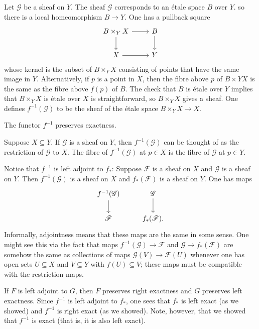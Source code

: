 \documentclass [11 pt, oneside, margin = 1 in] {article}
\begin{document}
Let $\mathscr{G}$ be a sheaf on $Y$. The sheaf $\mathscr{G}$ corresponds to an \'etale space $B$ over $Y$. so there is a local homeomorphism $B\longrightarrow Y$. One has a pullback square
\[
\begin{tikzcd}
	B\times_Y X \ar[r] \ar[d] & B\ar[d]\\
	X \ar[r] & Y
\end{tikzcd}
\]
whose kernel is the subset of $B\times_Y X$ consisting of points that have the same image in $Y$. Alternatively, if $p$ is a point in $X$, then the fibre above $p$ of $B\times Y X$ is the same as the fibre above $f(p)$ of $B$. The check that $B$ is \'etale over $Y$ implies that $B\times_Y X$ is \'etale over $X$ is straightforward, so $B\times_Y X$ gives a sheaf. One defines $f^{-1}(\mathscr{G})$ to be the sheaf of the \'etale space $B\times_Y X\longrightarrow X$.

\begin{remark}
	The functor $f^{-1}$ preserves exactness.
\end{remark}

\begin{example}[ ]\label{}\text{}
Suppose $X\subseteq Y$. If $\mathscr{G}$ is a sheaf on $Y$, then $f^{-1}(\mathscr{G})$ can be thought of as the restriction of $\mathscr{G}$ to $X$. The fibre of $f^{-1}(\mathscr{G})$ at $p\in X$ is the fibre of $\mathscr{G}$ at $p\in Y$.
\end{example}

Notice that $f^{-1}$ is left adjoint to $f_*$: Suppose $\mathscr{F}$ is a sheaf on $X$ and $\mathscr{G}$ is a sheaf on $Y$. Then $f^{-1}(\mathscr{G})$ is a sheaf on $X$ and $f_*(\mathscr{F})$ is a sheaf on $Y$. One has maps
\[
\begin{tikzcd}
	f^{-1}(\mathscr{G}) \ar[d]& \mathscr{G}\ar[d]\\
	\mathscr{F} & f_*(\mathscr{F}).
\end{tikzcd}
\]
Informally, adjointness means that these maps are the same in some sense. One might see this via the fact that maps $f^{-1}(\mathscr{G})\longrightarrow \mathscr{F}$ and $\mathscr{G}\longrightarrow f_*(\mathscr{F})$ are somehow the same as collections of maps $\mathscr{G}(V) \longrightarrow \mathscr{F}(U)$ whenever one has open sets $U\subseteq X$ and $V\subseteq Y$ with $f(U)\subseteq V$; these maps must be compatible with the restriction maps.

If $F$ is left adjoint to $G$, then $F$ preserves right exactness and $G$ preserves left exactness. Since $f^{-1}$ is left adjoint to $f_*$, one sees that $f_*$ is left exact (as we showed) and $f^{-1}$ is right exact (as we showed). Note, however, that we showed that $f^{-1}$ is exact (that is, it is also left exact).
\end{document}
